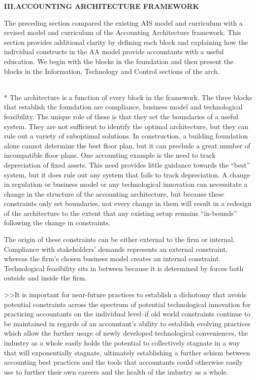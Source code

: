 \documentclass[12pt]{article}
\newcommand{\Section}[2]{\vspace{.2in}\centerline{\normalsize{}\textbf{#1\quad{}\MakeUppercase{#2}}}\nopagebreak{}\smallskip{}\indent{}}
\newcommand{\SubSection}[1]{\vspace{.15in}{\centering{}\normalsize{}\textbf{#1}}\\*\indent{}}
\begin{document}
\Section{III.}{Accounting Architecture Framework}
The preceding section compared the existing AIS model and curriculum with a revised model and curriculum of the Accounting Architecture framework. This section provides additional clarity by defining each block and explaining how the individual constructs in the AA model provide accountants with a useful education. We begin with the blocks in the foundation and then present the blocks in the Information, Technology and Control sections of the arch.

\SubSection{Foundation}
The architecture is a function of every block in the framework. The three blocks that establish the foundation are compliance, business model and technological feasibility. The unique role of these is that they set the boundaries of a useful system. They are not sufficient to identify the optimal architecture, but they can rule out a variety of suboptimal solutions. In construction, a building foundation alone cannot determine the best floor plan, but it can preclude a great number of incompatible floor plans. One accounting example is the need to track depreciation of fixed assets. This need provides little guidance towards the ``best'' system, but it does rule out any system that fails to track depreciation. A change in regulation or business model or any technological innovation can necessitate a change in the structure of the accounting architecture, but because these constraints only set boundaries, not every change in them will result in a redesign of the architecture to the extent that any existing setup remains ``in-bounds'' following the change in constraints.

The origin of these constraints can be either external to the firm or internal. Compliance with stakeholders' demands represents an external constraint, whereas the firm's chosen business model creates an internal constraint. Technological feasibility sits in between because it is determined by forces both outside and inside the firm.

>>It is important for near-future practices to establish a dichotomy that avoids potential constraints across the spectrum of potential technological innovation for practicing accountants on the individual level--if old world constraints continue to be maintained in regards of an accountant's ability to establish evolving practices which allow the further usage of newly developed technological conveniences, the industry as a whole easily holds the potential to collectively stagnate in a way that will exponentially stagnate, ultimately establishing a further schism between accounting best practices and the tools that accountants could otherwise easily use to further their own careers and the health of the industry as a whole. 
\end{document}
